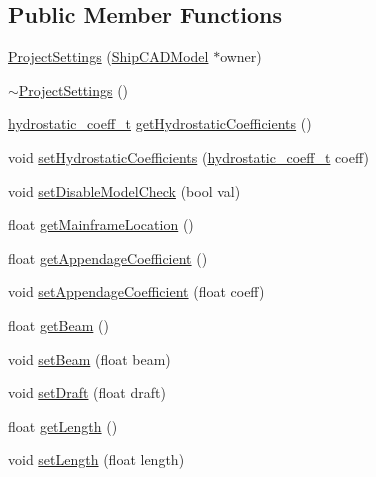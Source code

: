 \subsection*{Public Member Functions}
\begin{DoxyCompactItemize}
\item 
\hyperlink{classShipCAD_1_1ProjectSettings_a55001252531c21f4ccc89d8df9c6b184}{Project\-Settings} (\hyperlink{classShipCAD_1_1ShipCADModel}{Ship\-C\-A\-D\-Model} $\ast$owner)
\item 
\hyperlink{classShipCAD_1_1ProjectSettings_a4c74ba587e58e538083072285937aa4c}{$\sim$\-Project\-Settings} ()
\item 
\hyperlink{namespaceShipCAD_a9cf77f0900561de9efc572dcbad4dbbd}{hydrostatic\-\_\-coeff\-\_\-t} \hyperlink{classShipCAD_1_1ProjectSettings_aef0458c7bfa6e484a155e78eca0d0202}{get\-Hydrostatic\-Coefficients} ()
\item 
void \hyperlink{classShipCAD_1_1ProjectSettings_ab729e778076b560d876f09955212256d}{set\-Hydrostatic\-Coefficients} (\hyperlink{namespaceShipCAD_a9cf77f0900561de9efc572dcbad4dbbd}{hydrostatic\-\_\-coeff\-\_\-t} coeff)
\item 
void \hyperlink{classShipCAD_1_1ProjectSettings_ab9f9f88bba11a2093204affd18df17ab}{set\-Disable\-Model\-Check} (bool val)
\item 
float \hyperlink{classShipCAD_1_1ProjectSettings_a4dddaf7fe8bdbc0724c524244dd56497}{get\-Mainframe\-Location} ()
\item 
float \hyperlink{classShipCAD_1_1ProjectSettings_ada67c18ca75cb78d5591f24dcaf88b31}{get\-Appendage\-Coefficient} ()
\item 
void \hyperlink{classShipCAD_1_1ProjectSettings_a31fdcc5990fb3c61161fe783b5ed4939}{set\-Appendage\-Coefficient} (float coeff)
\item 
float \hyperlink{classShipCAD_1_1ProjectSettings_a451c6b10193f54fa76e9857005e31e61}{get\-Beam} ()
\item 
void \hyperlink{classShipCAD_1_1ProjectSettings_ac90d2a093ae0af951fd117d7f6981e92}{set\-Beam} (float beam)
\item 
void \hyperlink{classShipCAD_1_1ProjectSettings_a16a64f2a4a9b6359ac46b0a85f90a4ae}{set\-Draft} (float draft)
\item 
float \hyperlink{classShipCAD_1_1ProjectSettings_a989e357d35af68ac2da9b0e760926308}{get\-Length} ()
\item 
void \hyperlink{classShipCAD_1_1ProjectSettings_aad72cb11575e7a1ae0cda2c50f8de2ad}{set\-Length} (float length)
\item 

\end{DoxyCompactItemize}
